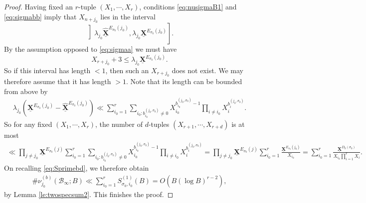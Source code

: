 \documentclass[11pt,letterpaper]{amsart}
\newcommand{\CB}{{\mathcal {B}}}
\newcommand{\XX}{\underline{\mathbf{X}}}
\theoremstyle{plain}
\numberwithin{equation}{section}
\theoremstyle{definition}
\theoremstyle{remark}
\begin{document}
\begin{proof}
	Having fixed an $r$-tuple $(X_1,\cdots,X_r)$, conditions \eqref{eq:nusigmaB1} and  \eqref{eq:sigmabb} imply that $X_{n+j_0}$ lies in the interval 
	$$\left]\lambda_{j_0}\widehat{\XX}^{E_{\sigma_0}(j_0)},\lambda_{j_0}\XX^{E_{\sigma_0}(j_0)}\right].$$ By the assumption opposed to \eqref{eq:sigmaa} we must have $$X_{r+j_0}+3\leqslant \lambda_{j_0} \XX^{E_{\sigma_0}(j_0)}.$$ So if this interval has length $<1$, then such an $X_{r+j_0}$ does not exist. We may therefore assume that it has length $>1$. Note that its length can be bounded from above by
	\begin{align*}
		\lambda_{j_0}\left(\XX^{E_{\sigma_0}(j_0)}-\widehat{\XX}^{E_{\sigma_0}(j_0)}\right)\ll \sum_{i_0=1}^{r}\sum_{i_0:b_{i_0}^{(j_0,\sigma_0)}\neq 0}X_{i_0}^{b_{i_0}^{(j_0,\sigma_0)}-1}\prod_{i\neq i_0}X_i^{b_{i}^{(j_0,\sigma_0)}}.
	\end{align*}
So for any fixed $(X_1,\cdots,X_r)$, the number of $d$-tuples $(X_{r+1},\cdots,X_{r+d})$ is at most
	\begin{equation*}
		\begin{split}
			\ll\prod_{j\neq j_0}\XX^{E_{\sigma_0}(j)}\sum_{i_0=1}^{r}\sum_{i_0:b_{i_0}^{(j_0,\sigma_0)}\neq 0}X_{i_0}^{b_{i_0}^{(j_0,\sigma_0)}-1}\prod_{i\neq i_0}X_i^{b_{i}^{(j_0,\sigma_0)}}= \prod_{j\neq j_0}\XX^{E_{\sigma_0}(j)}\sum_{i_0=1}^{r}\frac{\XX^{E_{\sigma_0}(j_0)}}{X_{i_0}}=\sum_{i_0=1}^{r}\frac{\XX^{D_0(\sigma_0)}}{X_{i_0}\prod_{i=1}^{r}X_i}.
	\end{split}\end{equation*}
	On recalling \eqref{eq:Sprimebd}, we therefore obtain
	\begin{align*}
	 \#\nu_{j_0}^{(b)}(\CB_\infty;B)\ll\sum_{i_0=1}^{r} S^{(1)}_{\sigma_0,i_0}(B)=O\left(B(\log B)^{r-2}\right),
	\end{align*}
	by Lemma  \ref{le:twospecsum2}. This finishes the proof.
\end{proof}
\end{document}
